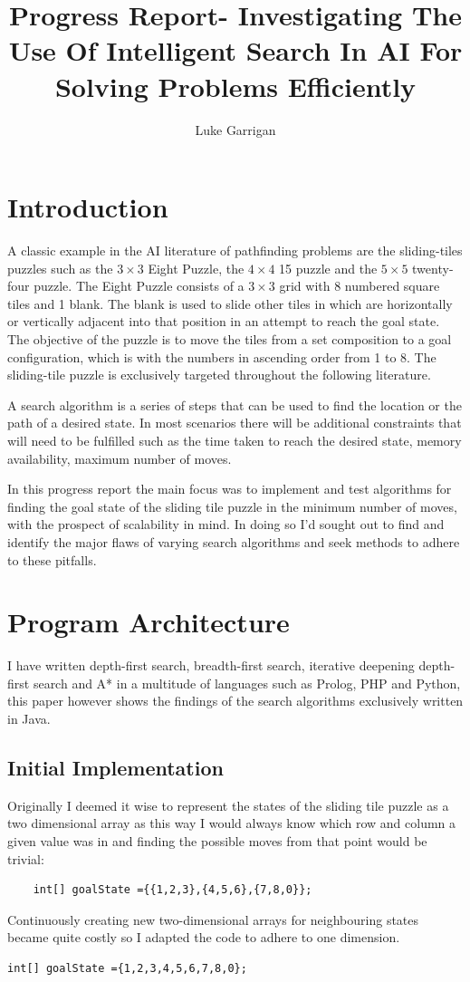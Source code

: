 \documentclass[progress]{cmpreport}
\title{Progress Report- Investigating The Use Of Intelligent Search In AI For Solving Problems Efficiently}
\author{Luke Garrigan}
\begin{document}
\section{Introduction}
A classic example in the AI literature of pathfinding problems are the sliding-tiles puzzles such as the $3\times3$ Eight Puzzle, the $4\times4$ 15 puzzle and the $5\times5$ twenty-four puzzle. The Eight Puzzle consists of a $3\times3$ grid with 8 numbered square tiles and 1 blank. The blank is used to slide other tiles in which are horizontally or vertically adjacent into that position in an attempt to reach the goal state. The objective of the puzzle is to move the tiles from a set composition to a goal configuration, which is with the numbers in ascending order from 1 to 8.
The sliding-tile puzzle is exclusively targeted throughout the following literature. 

A search algorithm is a series of steps that can be used to find the location or the path of a desired state. In most scenarios there will be additional constraints that will need to be fulfilled such as the time taken to reach the desired state, memory availability, maximum number of moves.

 In this progress report the main focus was to implement and test algorithms for finding the goal state of the sliding tile puzzle in the minimum number of moves, with the prospect of scalability in mind. In doing so I'd sought out to find and identify the major flaws of varying search algorithms and seek methods to adhere to these pitfalls. 
 
\section{Program Architecture}
I have written depth-first search, breadth-first search, iterative deepening depth-first search and A* in a multitude of languages such as Prolog, PHP and Python, this paper however shows the findings of the search algorithms exclusively written in Java. 
\subsection{Initial Implementation}
Originally I deemed it wise to represent the states of the sliding tile puzzle as a two dimensional array as this way I would always know which row and column a given value was in and finding the possible moves from that point would be trivial:
\begin{verbatim}
	int[] goalState ={{1,2,3},{4,5,6},{7,8,0}};
\end{verbatim}
Continuously creating new two-dimensional arrays for neighbouring states became quite costly so I adapted the code to adhere to one dimension. 
\begin{verbatim}
int[] goalState ={1,2,3,4,5,6,7,8,0};
\end{verbatim}
\end{document}
